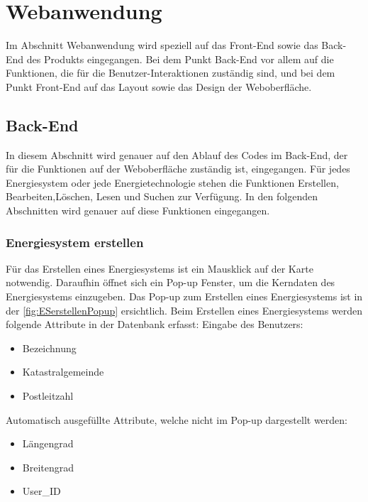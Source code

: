 \section{Webanwendung}
Im Abschnitt Webanwendung wird speziell auf das Front-End sowie das Back-End des Produkts eingegangen. Bei dem Punkt Back-End vor allem auf die Funktionen, die für die Benutzer-Interaktionen zuständig sind, und bei dem Punkt Front-End auf das Layout sowie das Design der Weboberfläche.


\subsection{Back-End}
In diesem Abschnitt wird genauer auf den Ablauf des Codes im Back-End, der für die Funktionen auf der Weboberfläche zuständig ist, eingegangen. 
Für jedes Energiesystem oder jede Energietechnologie stehen die Funktionen Erstellen, Bearbeiten,Löschen, Lesen und Suchen zur Verfügung. In den folgenden Abschnitten wird genauer auf diese Funktionen eingegangen.


\subsubsection{Energiesystem erstellen}
Für das Erstellen eines Energiesystems ist ein Mausklick auf der Karte notwendig. Daraufhin öffnet sich ein Pop-up Fenster, um die Kerndaten des Energiesystems einzugeben.
Das Pop-up zum Erstellen eines Energiesystems ist in der \autoref{fig:ESerstellenPopup} ersichtlich.
Beim Erstellen eines Energiesystems werden folgende Attribute in der Datenbank erfasst:
\newline 
\newline Eingabe des Benutzers:
\begin{itemize}
	\item Bezeichnung 
	\item Katastralgemeinde
	\item Postleitzahl
\end{itemize}

Automatisch ausgefüllte Attribute, welche nicht im Pop-up dargestellt werden:
\begin{itemize}
	\item Längengrad 
	\item Breitengrad
	\item User\_ID
\end{itemize}


